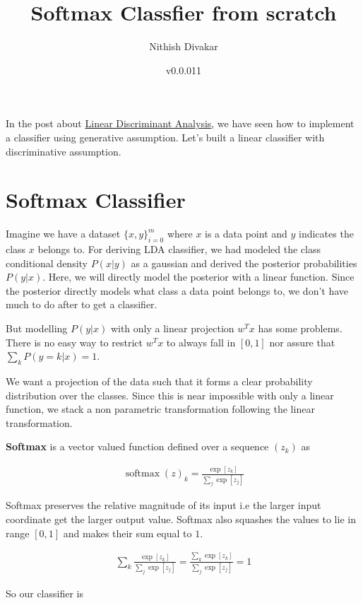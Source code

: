 \documentclass[10pt]{article}
\title{Softmax Classfier from scratch}
\author{Nithish Divakar}
\date{v0.0.011}
\begin{document}
\maketitle
In the post about \href{post_url 2018-03-15-linear-classifiers-and-how-to-build-one}{Linear Discriminant Analysis}, we have seen how to implement a classifier using generative assumption. Let's built a linear classifier with discriminative assumption. 
\tableofcontents
\section{Softmax Classifier}
Imagine we have a dataset $\{x,y\}_{i=0}^m$ where $x$ is a data point and $y$ indicates the class $x$ belongs to. For deriving LDA classifier, we had modeled the class conditional density $P(x|y)$ as a gaussian and derived the posterior probabilities $P(y|x)$. Here, we will directly model the posterior with a linear function. Since the posterior directly models what class a data point belongs to, we don't have much to do after to get a classifier.

But modelling $P(y|x)$ with only a linear projection $w^Tx$ has some problems. There is no easy way to restrict $w^Tx$ to always fall in $[0,1]$ nor assure that $\sum_k P(y=k|x) = 1$.
 
We want a projection of the data such that it forms a clear probability distribution over the classes. Since this is near impossible with only a linear function, we stack a non parametric transformation following the linear transformation. 

\textbf{Softmax} is a vector valued function defined over a sequence $(z_k)$ as

$$  \begin{aligned}
\operatorname{softmax}(z)_k = \frac{\operatorname{exp}[z_k]}{\sum_j\operatorname{exp}[z_j]}
\end{aligned} $$

Softmax preserves the relative magnitude of its input i.e the larger input coordinate get the larger output value. Softmax also squashes the values to lie in range $[0,1]$ and makes their sum equal to $1$. 

$$  \begin{aligned}
\sum_k \frac{\operatorname{exp}[z_k]}{\sum_j\operatorname{exp}[z_j]} = \frac{\sum_k \operatorname{exp}[z_k]}{\sum_j\operatorname{exp}[z_j]}  = 1
\end{aligned} $$


So our classifier is
\end{document}
